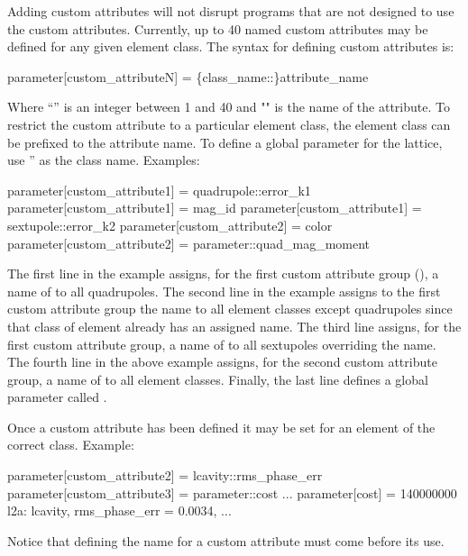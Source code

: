 {{{{{Adding custom attributes will not disrupt programs that are not designed to use the custom
attributes. Currently, up to 40 named custom attributes may be defined for any given element
class. The syntax for defining custom attributes is:
\begin{example}
  parameter[custom_attributeN] = \{class_name::\}attribute_name
\end{example}
Where ``'' is an integer between 1 and 40 and "" is the name of the
attribute. To restrict the custom attribute to a particular element class, the element class can be
prefixed to the attribute name. To define a global parameter for the lattice, use ''
as the class name.
Examples:
\begin{example}
  parameter[custom_attribute1] = quadrupole::error_k1
  parameter[custom_attribute1] = mag_id
  parameter[custom_attribute1] = sextupole::error_k2
  parameter[custom_attribute2] = color
  parameter[custom_attribute2] = parameter::quad_mag_moment
\end{example}
The first line in the example assigns, for the first custom attribute group
(), a name of  to all quadrupoles. The second line in the example
assigns to the first custom attribute group the name  to all element classes except
quadrupoles since that class of element already has an assigned name. The third line assigns, for
the first custom attribute group, a name of  to all sextupoles overriding the
 name. The fourth line in the above example assigns, for the second custom attribute
group, a name of  to all element classes. Finally, the last line defines a global parameter
called .

Once a custom attribute has been defined it may be set for an element
of the correct class. Example:
\begin{example}
  parameter[custom_attribute2] = lcavity::rms_phase_err
  parameter[custom_attribute3] = parameter::cost
  ...
  parameter[cost] = 140000000
  l2a: lcavity, rms_phase_err = 0.0034, ...
\end{example}
Notice that defining the name for a custom attribute must come before its use.

}}}}}
